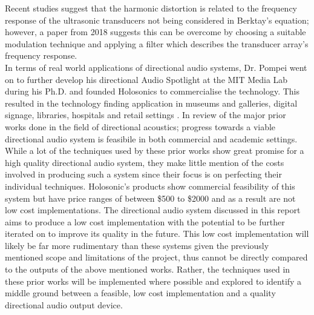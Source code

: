 Recent studies suggest that the harmonic distortion is related to the frequency response of the ultrasonic transducers not being considered in Berktay's equation; however, a paper from 2018 \cite{farias_abdulla_2018} suggests this can be overcome by choosing a suitable modulation technique and applying a filter which describes the transducer array's frequency response.\\
In terms of real world applications of directional audio systems, Dr. Pompei went on to further develop his directional Audio Spotlight at the MIT Media Lab during his Ph.D. and founded Holosonics to commercialise the technology. This resulted in the technology finding application in museums and galleries, digital signage, libraries, hospitals and retail settings \cite{holosonicsresearchlabs_2002}.
In review of the major prior works done in the field of directional acoustics; progress towards a viable directional audio system is feasibile in both commercial and academic settings. While a lot of the techniques used by these prior works show great promise for a high quality directional audio system, they make little mention of the costs involved in producing such a system since their focus is on perfecting their individual techniques. Holosonic's products show commercial feasibility of this system but have price ranges of between \$500 to \$2000 and as a result are not low cost implementations. The directional audio system discussed in this report aims to produce a low cost implementation with the potential to be further iterated on to improve its quality in the future. This low cost implementation will likely be far more rudimentary than these systems given the previously mentioned scope and limitations of the project, thus cannot be directly compared to the outputs of the above mentioned works. Rather, the techniques used in these prior works will be implemented where possible and explored to identify a middle ground between a feasible, low cost implementation and a quality directional audio output device.